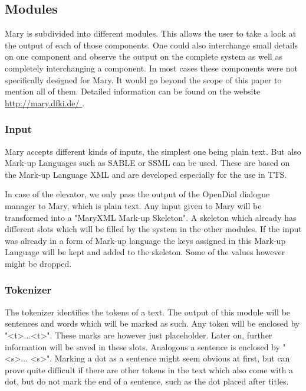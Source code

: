 \documentclass[a4paper, 12pt]{article}
\begin{document}
\subsection{Modules}

Mary is subdivided into different modules. 
This allows the user to take a look at the output of each of those components. 
One could also interchange small details on one component and observe the output on the complete system as well as completely interchanging a component.
In most cases these components were not specifically designed for Mary. 
It would go beyond the scope of this paper to mention all of them. 
Detailed information can be found on the website \url{http://mary.dfki.de/ }.

\subsubsection*{Input}

Mary accepts different kinds of inputs, the simplest one being plain text.
But also Mark-up Languages such as SABLE or SSML can be used. 
These are based on the Mark-up Language XML and are developed especially for the use in TTS.

In case of the elevator, we only pass the output of the OpenDial dialogue manager to Mary, which is plain text.
Any input given to Mary will be transformed into a "MaryXML Mark-up Skeleton". 
A skeleton which already has different slots which will be filled by the system in the other modules.
If the input was already in a form of Mark-up language the keys assigned in this Mark-up Language will be kept and added to the skeleton. Some of the values however might be dropped.

\subsubsection*{Tokenizer}

The tokenizer identifies the tokens of a text. The output of this module will be sentences and words which will be marked as such.
Any token will be enclosed by "\textless t\textgreater ...\textless  t\textgreater". 
These marks are however just placeholder. 
Later on, further information will be saved in these slots.
Analogous a sentence is enclosed by "\textless s\textgreater ... \textless s\textgreater". 
Marking a dot as a sentence might seem obvious at first, but can prove quite difficult if there are other tokens in the text which also come with a dot, but do not mark the end of a sentence, such as the dot placed after titles.
\end{document}

